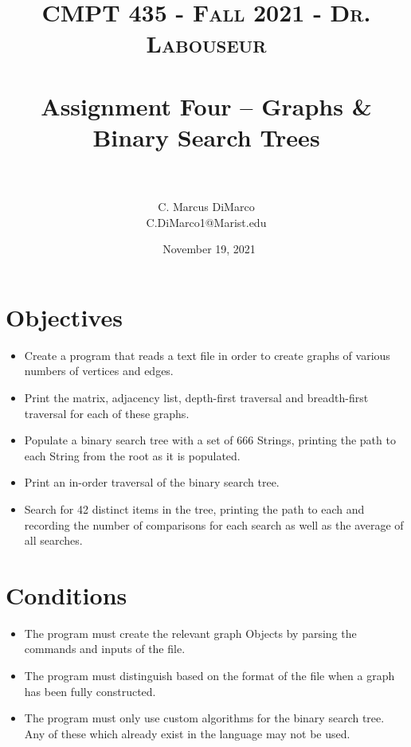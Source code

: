 \documentclass[letterpaper, 10pt]{article}
\title{	
   \normalfont \normalsize 
   \textsc{CMPT 435 - Fall 2021 - Dr. Labouseur} \\[10pt] %
   \horrule{0.5pt} \\[0.25cm] 	%
   \huge Assignment Four -- Graphs \& Binary Search Trees \\     	    %
   \horrule{0.5pt} \\[0.25cm] 	%
}
\author{C. Marcus DiMarco \\ \normalsize C.DiMarco1@Marist.edu}
\date{\normalsize\ November 19, 2021} 	%
\begin{document}
\maketitle %



\section{Objectives}

\begin{itemize}
    \item \hspace{0.5em}Create a program that reads a text file in order to create graphs of various numbers of vertices and edges.
    \item \hspace{0.5em}Print the matrix, adjacency list, depth-first traversal and breadth-first traversal for each of these graphs.
    \item \hspace{0.5em}Populate a binary search tree with a set of 666 Strings, printing the path to each String from the root as it is populated.
    \item \hspace{0.5em}Print an in-order traversal of the binary search tree.
    \item \hspace{0.5em}Search for 42 distinct items in the tree, printing the path to each and recording the number of comparisons for each search as well as the average of all searches.
\end{itemize}

\vspace{1.0em}

\section{Conditions}

\begin{itemize}
    \item \hspace{0.5em}The program must create the relevant graph Objects by parsing the commands and inputs of the file.
    \item \hspace{0.5em}The program must distinguish based on the format of the file when a graph has been fully constructed.
    \item \hspace{0.5em}The program must only use custom algorithms for the binary search tree. Any of these which already exist in the language may not be used.
\end{itemize}
\end{document}
